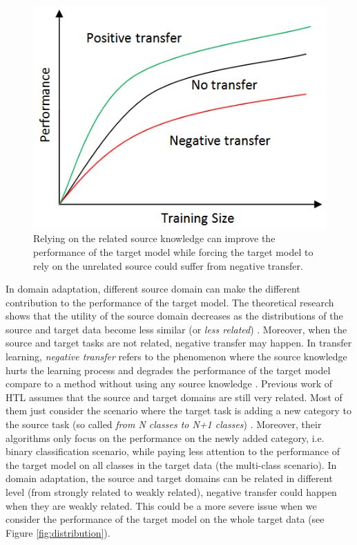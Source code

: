 \begin{figure}[h]
\centering
\includegraphics[scale=.4]{fig/negative.png}
\caption{Relying on the related source knowledge can improve the performance of the target model while forcing the target model to rely on the unrelated source could suffer from negative transfer.}
\end{figure}

In domain adaptation, different source domain can make the different contribution to the performance of the target model.
The theoretical research shows that the utility of the source domain decreases as the distributions of the source and target data become less similar (or \textit{less related})  \cite{ben2010theory} \cite{ben2007analysis}. Moreover, when the source and target tasks are not related, negative transfer may happen. In transfer learning, \textit{negative transfer} 
refers to the phenomenon where the source knowledge hurts the learning process and degrades the performance of the target model compare to a method without using any source knowledge \cite{pan2010survey}. 
Previous work of HTL assumes that the source and target domains are still very related. Most of them just consider the scenario where the target task is adding a new category to the source task (so called \textit{from N classes to N+1 classes}) \cite{tommasi2014learning} \cite{kuzborskij2013n} \cite{jie2011multiclass}. Moreover, their algorithms only focus on the performance on the newly added category, i.e. binary classification scenario, while paying less attention to the performance of the target model on all classes in the target data (the multi-class scenario). In domain adaptation, the source and target domains can be related in different level (from strongly related to weakly related), negative transfer could happen when they are weakly related. This could be a more severe issue when we consider the performance of the target model on the whole target data (see Figure \ref{fig:distribution}).

